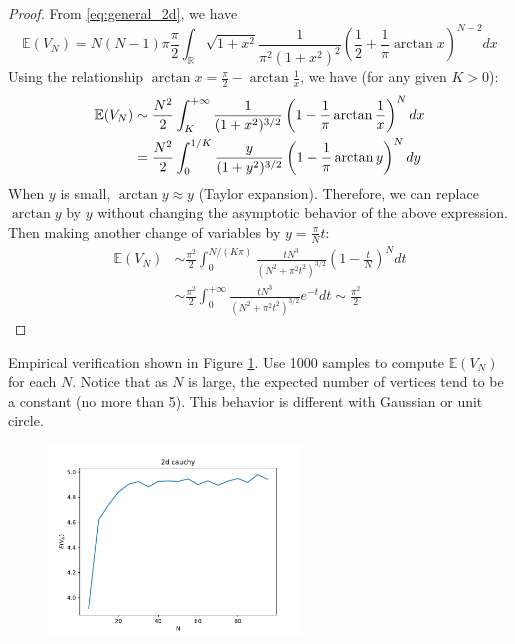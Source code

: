 \documentclass{article}
\def\E{\mathbb{E}}
\def\R{\mathbb{R}}
\begin{document}
\begin{proof}
From \eqref{eq:general_2d},
we have
\begin{equation}\label{eq:d_2_cauchy_E_V_n}
\E(V_N) = N(N-1)\pi \frac{\pi}{2}\int_{\R}
\sqrt{1+x^2}\frac{1}{\pi^2 (1+x^2)^2}(\frac{1}{2}
+\frac{1}{\pi}\arctan x)^{N-2}dx
\end{equation}
Using the relationship $\arctan x =
\frac{\pi}{2} - \arctan \frac{1}{x}
$, we have (for any given $K>0$):
\begin{align}
    \E(V_N) &\sim \frac{N^2}{2}\int_{K}^{+\infty}
    \frac{1}{(1+x^2)^{3/2}}
    \left(1-\frac{1}{\pi}\arctan \frac{1}{x} \right)^{N}dx\notag \\
    &=\frac{N^2}{2}\int_{0}^{1/K}
    \frac{y}{(1+y^2)^{3/2}}
    \left(1-\frac{1}{\pi}\arctan y\right)^{N}dy
    \label{eq:cauchy_inverse_K_y}\\
\end{align}
When $y$ is small, $\arctan y \approx y$ (Taylor expansion).
Therefore, we can replace $\arctan y$ by $y$ without changing the
asymptotic behavior of the above expression.
Then making another change of variables by
$y=\frac{\pi}{N}t$:
\begin{align*}
    \E(V_N) &\sim \frac{\pi^2}{2}\int_{0}^{N/(K\pi)}
    \frac{tN^3}{(N^2+\pi^2 t^2)^{3/2}}
    \left(1-\frac{t}{N}\right)^{N}dt\\
    &\sim \frac{\pi^2}{2}\int_{0}^{+\infty}
    \frac{tN^3}{(N^2+\pi^2 t^2)^{3/2}}
    e^{-t}dt \sim  \frac{\pi^2}{2}
\end{align*}
\end{proof}
Empirical verification shown in Figure \ref{fig:2d_cauchy}. Use 1000 samples to compute $\E(V_N)$
for each $N$. Notice that as $N$ is large, the expected
number of vertices tend to be a constant (no more than 5).
This behavior is different with Gaussian or unit circle.

\begin{figure}[!ht]
    \centering
    \includegraphics[width=0.6\textwidth]{2d_cauchy_vertices.pdf}
    \caption{}\label{fig:2d_cauchy}
\end{figure}
\end{document}
